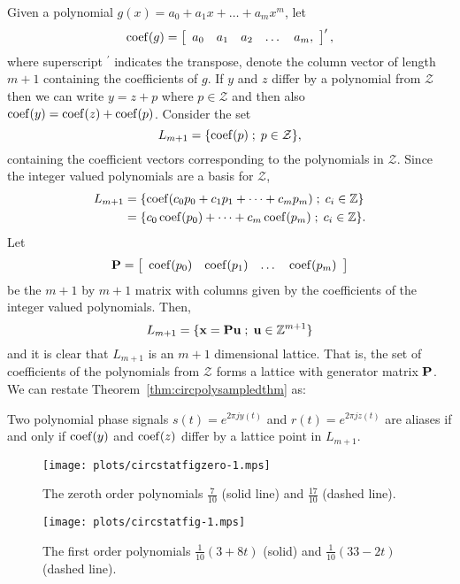\documentclass[journal]{IEEEtran}
\begin{document}
Given a polynomial $g(x) = a_0 + a_1x + \dots + a_m x^m$, let
\[
\operatorname{coef}(g) = \left[ \begin{array}{ccccc} a_0 & a_1 & a_2 & \dots & a_m, \end{array} \right]^\prime,
\]
where superscript $^\prime$ indicates the transpose, denote the column vector of length $m+1$ containing the coefficients of $g$.  If $y$ and $z$ differ by a polynomial from $\mathcal{Z}$ then we can write $y = z + p$ where $p \in \mathcal{Z}$ and then also $\operatorname{coef}(y) = \operatorname{coef}(z) + \operatorname{coef}(p)$.
  Consider the set
\[
L_{m+1} = \{ \operatorname{coef}(p) \; ; \; p \in \mathcal{Z} \},
\]
containing the coefficient vectors corresponding to the polynomials in $\mathcal{Z}$.  Since the integer valued polynomials are a basis for $\mathcal{Z}$,
\begin{align*}
L_{m+1} &= \{ \operatorname{coef}(c_0 p_0 + c_1p_1 + \dots + c_mp_m) \; ; \; c_i \in {\mathbb Z} \} \\
&= \{ c_0 \operatorname{coef}(p_0) + \dots + c_m\operatorname{coef}(p_m) \; ; \; c_i \in {\mathbb Z} \}.
\end{align*}
Let
\[
\mathbf{P} = \left[ \begin{array}{cccc} \operatorname{coef}(p_0)& \operatorname{coef}(p_1)& \dots& \operatorname{coef}(p_m)  \end{array} \right]
\]
be the $m+1$ by $m+1$ matrix with columns given by the coefficients of the integer valued polynomials.  Then,
\[
L_{m+1} = \{ \mathbf{x} = \mathbf{P}\mathbf{u} \; ; \; \mathbf{u} \in {\mathbb Z}^{m+1} \}
\]
and it is clear that $L_{m+1}$ is an $m+1$ dimensional lattice.  That is, the set of coefficients of the polynomials from $\mathcal{Z}$ forms a lattice with generator matrix $\mathbf{P}$. We can restate Theorem~\ref{thm:circpolysampledthm} as:
\begin{corollary}\label{cor:circpolysampledcoef}
Two polynomial phase signals $s(t) = e^{2\pi j y(t)}$  and $r(t) = e^{2\pi j z(t)}$ are aliases if and only if $\operatorname{coef}(y)$ and $\operatorname{coef}(z)$ differ by a lattice point in $L_{m+1}$.
\end{corollary}

\begin{figure}[p]
	\centering
		\texttt{[image: plots/circstatfigzero-1.mps]}
		\caption{The zeroth order polynomials $\tfrac{7}{10}$ (solid line) and $\tfrac{17}{10}$ (dashed line).}		
\label{fig:circstatplot_zero}
\end{figure}

\begin{figure}[p]
	\centering
		\texttt{[image: plots/circstatfig-1.mps]}
		\caption{The first order polynomials $\tfrac{1}{10}(3 + 8t)$ (solid) and $\tfrac{1}{10}(33 - 2t)$ (dashed line).}
		\label{fig:circstatplot_line}
\end{figure}
\end{document}
